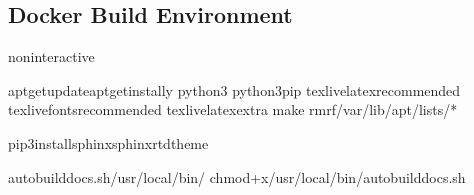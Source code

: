 \documentclass[letterpaper,10pt,english]{sphinxmanual}
\begin{document}
\subsection{Docker Build Environment}
\label{\detokenize{downloads:docker-build-environment}}
\begin{sphinxVerbatim}[commandchars=\\\{\}]

noninteractive

apt\PYGZhy{}getupdateapt\PYGZhy{}getinstall\PYGZhy{}y
python3
python3\PYGZhy{}pip
texlive\PYGZhy{}latex\PYGZhy{}recommended
texlive\PYGZhy{}fonts\PYGZhy{}recommended
texlive\PYGZhy{}latex\PYGZhy{}extra
make
rm\PYGZhy{}rf/var/lib/apt/lists/*

pip3installsphinxsphinx\PYGZhy{}rtd\PYGZhy{}theme


auto\PYGZhy{}build\PYGZhy{}docs.sh/usr/local/bin/
chmod+x/usr/local/bin/auto\PYGZhy{}build\PYGZhy{}docs.sh

\PYG{p}{[}\PYG{p}{]}
\end{sphinxVerbatim}
\end{document}
